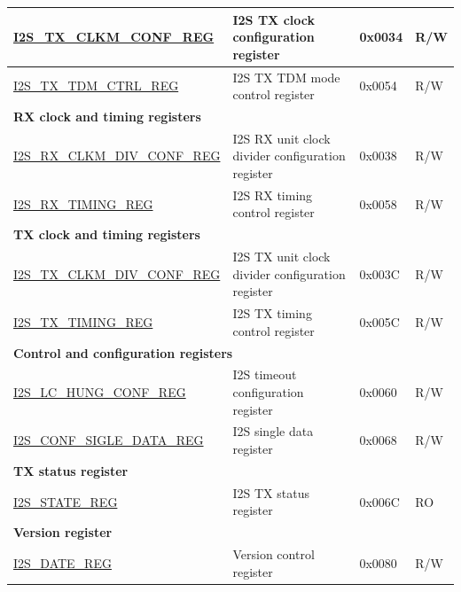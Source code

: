 \begin{longtable}{ | p{5cm} | p{7.2cm} | p{1.3cm} | p{2cm} | }
\hyperref[regdesc:I2STXCLKMCONFREG]{I2S\_TX\_CLKM\_CONF\_REG} & I2S TX clock configuration register & 0x0034 & R/W \\ \hline
\hyperref[regdesc:I2STXTDMCTRLREG]{I2S\_TX\_TDM\_CTRL\_REG} & I2S TX TDM mode control register & 0x0054 & R/W \\ \hline
\multicolumn{4}{|l|}{\textbf{RX clock and timing registers}} \\ \hline
\hyperref[regdesc:I2SRXCLKMDIVCONFREG]{I2S\_RX\_CLKM\_DIV\_CONF\_REG} & I2S RX unit clock divider configuration register & 0x0038 & R/W \\ \hline
\hyperref[regdesc:I2SRXTIMINGREG]{I2S\_RX\_TIMING\_REG} & I2S RX timing control register & 0x0058 & R/W \\ \hline
\multicolumn{4}{|l|}{\textbf{TX clock and timing registers}} \\ \hline
\hyperref[regdesc:I2STXCLKMDIVCONFREG]{I2S\_TX\_CLKM\_DIV\_CONF\_REG} & I2S TX unit clock divider configuration register & 0x003C & R/W \\ \hline
\hyperref[regdesc:I2STXTIMINGREG]{I2S\_TX\_TIMING\_REG} & I2S TX timing control register & 0x005C & R/W \\ \hline
\multicolumn{4}{|l|}{\textbf{Control and configuration registers}} \\ \hline
\hyperref[regdesc:I2SLCHUNGCONFREG]{I2S\_LC\_HUNG\_CONF\_REG} & I2S timeout configuration register & 0x0060 & R/W \\ \hline
\hyperref[regdesc:I2SCONFSIGLEDATAREG]{I2S\_CONF\_SIGLE\_DATA\_REG} & I2S single data register & 0x0068 & R/W \\ \hline
\multicolumn{4}{|l|}{\textbf{TX status register}} \\ \hline
\hyperref[regdesc:I2SSTATEREG]{I2S\_STATE\_REG} & I2S TX status register & 0x006C & RO \\ \hline
\multicolumn{4}{|l|}{\textbf{Version register}} \\ \hline
\hyperref[regdesc:I2SDATEREG]{I2S\_DATE\_REG} & Version control register & 0x0080 & R/W \\ \hline
\end{longtable}
